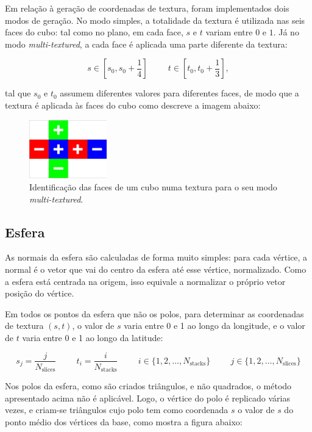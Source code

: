 \documentclass[12pt, a4paper]{article}
\begin{document}
Em relação à geração de coordenadas de textura, foram implementados dois modos de geração. No modo
simples, a totalidade da textura é utilizada nas seis faces do cubo: tal como no plano, em cada
face, $s$ e $t$ variam entre $0$ e $1$. Já no modo \emph{multi-textured}, a cada face é aplicada uma
parte diferente da textura:

$$
s \in \left [ s_0, s_0 + \frac{1}{4} \right ]
\hspace{1cm}
t \in \left [ t_0, t_0 + \frac{1}{3} \right ],
$$

tal que $s_0$ e $t_0$ assumem diferentes valores para diferentes faces, de modo que a textura é
aplicada às faces do cubo como descreve a imagem abaixo:

\begin{figure}[H]
    \centering
    \includegraphics[width=0.3\textwidth]{res/phase4/BoxOrientation.png}
    \caption{Identificação das faces de um cubo numa textura para o seu modo \emph{multi-textured}.}
\end{figure}

\subsection{Esfera}

As normais da esfera são calculadas de forma muito simples: para cada vértice, a normal é o vetor
que vai do centro da esfera até esse vértice, normalizado. Como a esfera está centrada na origem,
isso equivale a normalizar o próprio vetor posição do vértice.

Em todos os pontos da esfera que não os polos, para determinar as coordenadas de textura $(s, t)$, o
valor de $s$ varia entre 0 e 1 ao longo da longitude, e o valor de $t$ varia entre 0 e 1 ao longo da
latitude:

$$
s_j = \frac{j}{N_\text{slices}}
\hspace{1cm}
t_i = \frac{i}{N_\text{stacks}}
\hspace{1cm}
i \in \lbrace 1, 2, \ldots, N_\text{stacks} \rbrace
\hspace{1cm}
j \in \lbrace 1, 2, \ldots, N_\text{slices} \rbrace
$$

Nos polos da esfera, como são criados triângulos, e não quadrados, o método apresentado acima não é
aplicável. Logo, o vértice do polo é replicado várias vezes, e criam-se triângulos cujo polo tem
como coordenada $s$ o valor de $s$ do ponto médio dos vértices da base, como mostra a figura abaixo:
\end{document}
